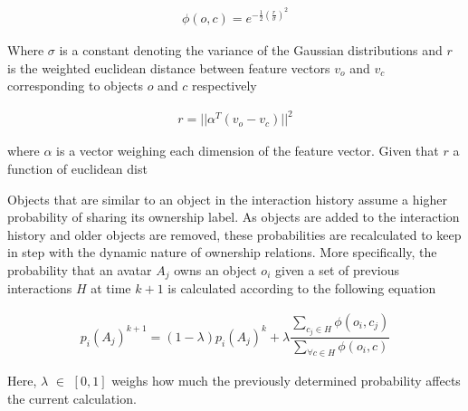 \documentclass[11pt]{article}
\begin{document}
\begin{equation*}
\begin{aligned}
\phi(o, c) = e^{-\frac{1}{2} (\frac{r}{\sigma})^{2}}
\end{aligned}
\end{equation*}


Where \(\sigma\) is a constant denoting the variance of the Gaussian distributions and \(r\) is the weighted euclidean distance between feature vectors \(v_{o}\) and \(v_{c}\) corresponding to objects \(o\) and \(c\) respectively


\begin{equation*}
\begin{aligned}
r = ||\alpha^{T}(v_{o} - v_{c}) ||^{2}
\end{aligned} 
\end{equation*}

where \(\alpha\) is a vector weighing each dimension of the feature vector. Given that \(r\) a function of euclidean dist

Objects that are similar to an object in the interaction history assume a higher probability of sharing its ownership label. As objects are added to the interaction history and older objects are removed, these probabilities are recalculated to keep in step with the dynamic nature of ownership relations. More specifically, the probability that an avatar \(A_{j}\) owns an object \(o_{i}\) given a set of previous interactions \(H\) at time \(k+1\) is calculated according to the following equation

\begin{equation*}
\begin{aligned}
p_{i}(A_{j})^{k+1} = (1 - \lambda)p_{i}(A_{j})^{k} + \lambda\dfrac{\sum_{c_{j} \in H}^{}\phi(o_{i}, c_{j})}{\sum_{\forall c \in H}^{}\phi(o_{i}, c)}

\end{aligned}
\end{equation*}

Here, \(\lambda\) \(\in\) \([0,1]\) weighs how much the previously determined probability affects the current calculation. 
\end{document}
